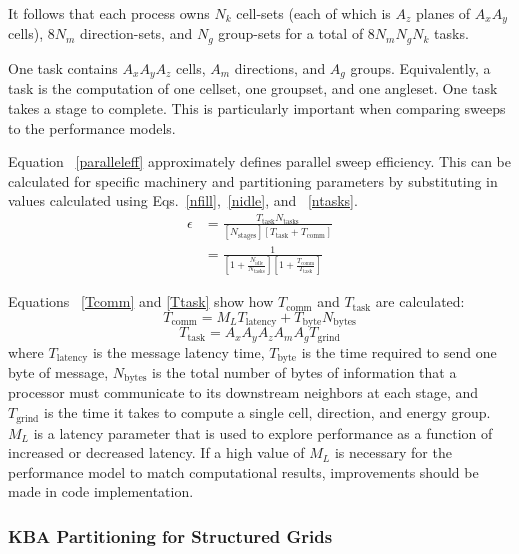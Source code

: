 \documentclass{anstrans}
\begin{document}
It follows that each process owns $N_k$ cell-sets (each of which is $A_z$ planes of $A_x A_y$ cells), $8N_m$ direction-sets, and $N_g$ group-sets for a total of $8N_m N_g N_k$ tasks.

One task contains $A_x A_y A_z$ cells, $A_m$ directions, and $A_g$ groups. Equivalently, a task is the computation of one cellset, one groupset, and one angleset. One task takes a stage to complete.  This is particularly important when comparing sweeps to the performance models. 

Equation ~\eqref{paralleleff} approximately defines parallel sweep efficiency. This can be calculated for specific machinery and partitioning parameters by substituting in values calculated using Eqs.~\eqref{nfill},~\eqref{nidle}, and ~\eqref{ntasks}.
\begin{equation}\label{paralleleff}
\begin{split}
\epsilon &= \frac{T_{\text{task}} N_{\text{tasks}}}{[N_{\text{stages}}] [T_{\text{task}} + T_{\text{comm}}]} \\
            &=\frac{1}{[1+\frac{N_{\text{idle}}}{N_{\text{tasks}}}][1 + \frac{T_{\text{comm}}}{T_{\text{task}}}]}
\end{split}
\end{equation}

Equations ~\eqref{Tcomm} and \ref{Ttask} show how $T_{\text{comm}}$ and $T_{\text{task}}$ are calculated:
\begin{equation}
T_{\text{comm}} = M_L T_{\text{latency}} + T_{\text{byte}} N_{\text{bytes}}
\label{Tcomm}
\end{equation}
\begin{equation}
T_{\text{task}} = A_x A_y A_z A_m A_g T_{\text{grind}}
\label{Ttask}
\end{equation}
where $T_{\text{latency}}$ is the message latency time, $T_{\text{byte}}$ is the time required to send one byte of message, $N_{\text{bytes}}$ is the total number of bytes of information that a processor must communicate to its downstream neighbors at each stage, and $T_{\text{grind}}$ is the time it takes to compute a single cell, direction, and energy group. $M_L$ is a latency parameter that is used to explore performance as a function of increased or decreased latency. If a high value of $M_L$ is necessary for the performance model to match computational results, improvements should be made in code implementation.

\subsubsection{KBA Partitioning for Structured Grids}
\end{document}
